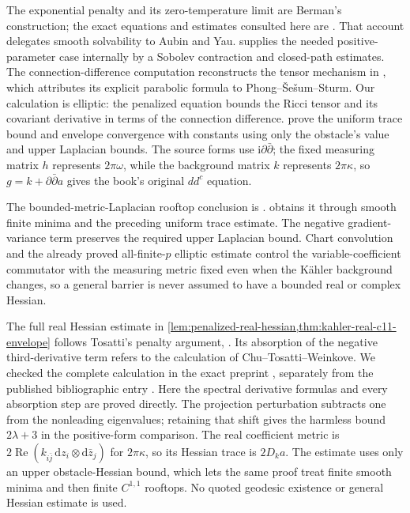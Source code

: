 The exponential penalty and its zero-temperature limit are Berman's construction; the exact equations and estimates consulted here are \cite[equations (2.1)--(2.2), pp.~282--283]{Tos18}. That account delegates smooth solvability to Aubin and Yau.  supplies the needed positive-parameter case internally by a Sobolev contraction and closed-path estimates. The connection-difference computation reconstructs the tensor mechanism in \cite[Proposition 2.8 and Theorem 2.9, pp.~24--26]{SongWeinkove2012v1}, which attributes its explicit parabolic formula to Phong--\v Se\v sum--Sturm. Our calculation is elliptic: the penalized equation bounds the Ricci tensor and its covariant derivative in terms of the connection difference.  prove the uniform trace bound and envelope convergence with constants using only the obstacle's value and upper Laplacian bounds. The source forms use $\mathrm i\partial\bar\partial$; the fixed measuring matrix $h$ represents $2\pi\omega$, while the background matrix $k$ represents $2\pi\kappa$, so $g=k+\partial\bar\partial a$ gives the book's original $dd^c$ equation.

The bounded-metric-Laplacian rooftop conclusion is \cite[Theorem 2.5(ii), p.~5]{DarvasRubinstein2014v1}.  obtains it through smooth finite minima and the preceding uniform trace estimate. The negative gradient-variance term preserves the required upper Laplacian bound. Chart convolution and the already proved all-finite-$p$ elliptic estimate control the variable-coefficient commutator with the measuring metric fixed even when the K\"ahler background changes, so a general barrier is never assumed to have a bounded real or complex Hessian.

The full real Hessian estimate in \cref{lem:penalized-real-hessian,thm:kahler-real-c11-envelope} follows Tosatti's penalty argument, \cite[pp.~283--287]{Tos18}. Its absorption of the negative third-derivative term refers to the calculation of Chu--Tosatti--Weinkove. We checked the complete calculation in the exact preprint \cite[Section 2, Lemmas 2.1--2.2, pp.~4--10]{ChuTosattiWeinkove2017v2}, separately from the published bibliographic entry \cite{CTW17}. Here the spectral derivative formulas and every absorption step are proved directly. The projection perturbation subtracts one from the nonleading eigenvalues; retaining that shift gives the harmless bound $2\lambda+3$ in the positive-form comparison. The real coefficient metric is $2\operatorname{Re}(k_{i\bar j}\,\mathrm dz_i\otimes\mathrm d\bar z_j)$ for $2\pi\kappa$, so its Hessian trace is $2D_ka$. The estimate uses only an upper obstacle-Hessian bound, which lets the same proof treat finite smooth minima and then finite $C^{1,1}$ rooftops. No quoted geodesic existence or general Hessian estimate is used.

